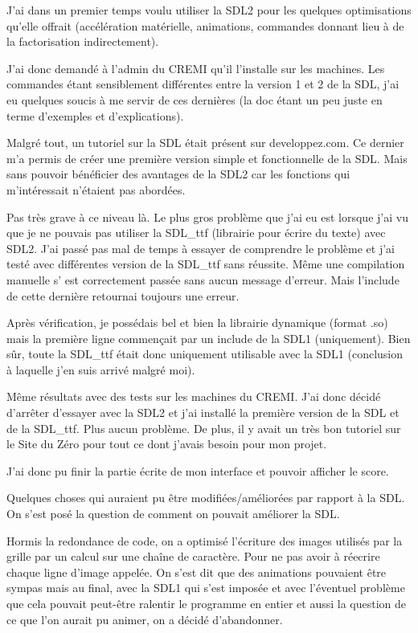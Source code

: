 \documentclass{article}
\begin{document}
J'ai dans un premier temps voulu utiliser la SDL2 pour les quelques optimisations qu'elle offrait (accélération matérielle, animations, commandes donnant lieu à de la factorisation indirectement).

J'ai donc demandé à l'admin du CREMI qu'il l'installe sur les machines. Les commandes étant sensiblement différentes entre la version 1 et 2 de la SDL, j'ai eu quelques soucis à me servir de ces dernières (la doc étant un peu juste en terme d'exemples et d'explications).

Malgré tout, un tutoriel sur la SDL était présent sur developpez.com. Ce dernier m'a permis de créer une première version simple et fonctionnelle de la SDL. Mais sans pouvoir bénéficier des avantages de la SDL2 car les fonctions qui m'intéressait n'étaient pas abordées.

Pas très grave à ce niveau là. Le plus gros problème que j'ai eu est lorsque j'ai vu que je ne pouvais pas utiliser la SDL\_ttf (librairie pour écrire du texte) avec SDL2. J'ai passé pas mal de temps à essayer de comprendre le problème et j'ai testé avec différentes version de la SDL\_ttf sans réussite. Même une compilation manuelle s' est correctement passée sans aucun message d'erreur. Mais l'include de cette dernière retournai toujours une erreur.

Après vérification, je possédais bel et bien la librairie dynamique (format .so) mais la première ligne commençait par un include de la SDL1 (uniquement). Bien sûr, toute la SDL\_ttf était donc uniquement utilisable avec la SDL1 (conclusion à laquelle j'en suis arrivé malgré moi).

Même résultats avec des tests sur les machines du CREMI. J'ai donc décidé d'arrêter d'essayer avec la SDL2 et j'ai installé la première version de la SDL et de la SDL\_ttf. Plus aucun problème. De plus, il y avait un très bon tutoriel sur le Site du Zéro pour tout ce dont j'avais besoin pour mon projet.

J'ai donc pu finir la partie écrite de mon interface et pouvoir afficher le score.

Quelques choses qui auraient pu être modifiées/améliorées par rapport à la SDL.
On s'est posé la question de comment on pouvait améliorer la SDL.

Hormis la redondance de code, on a optimisé l'écriture des images utilisés par la grille par un calcul sur une chaîne de caractère. Pour ne pas avoir à réecrire chaque ligne d'image appelée. 
On s'est dit que des animations pouvaient être sympas mais au final, avec la SDL1 qui s'est imposée et avec l'éventuel problème que cela pouvait peut-être ralentir le programme en entier et aussi la question de ce que l'on aurait pu animer, on a décidé d'abandonner.
\end{document}
